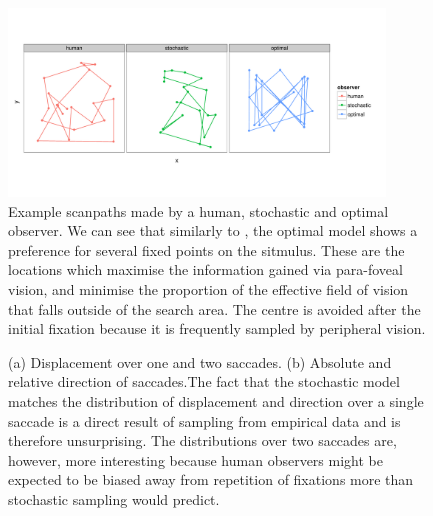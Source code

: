 \documentclass[preprint, authoryear]{elsarticle} %
\begin{document}
\begin{figure}
	\centering
	\includegraphics[width=10cm]{fig/exScanpaths.pdf}
	\caption{Example scanpaths made by a human, stochastic and optimal observer. We can see that similarly to \citet{najemnik-geisler2008}, the optimal model shows a preference for several fixed points on the sitmulus. These are the locations which maximise the information gained via para-foveal vision, and minimise the proportion of the effective field of vision that falls outside of the search area. The centre is avoided after the initial fixation because it is frequently sampled by peripheral vision.} 
	\label{fig:exScanpaths}
\end{figure}


\begin{figure}
	\centering
	\caption{(a) Displacement over one and two saccades. (b) Absolute and relative direction of saccades.The fact that the stochastic model matches the distribution of displacement and direction over a single saccade is a direct result of sampling from empirical data and is therefore unsurprising. The distributions over two saccades are, however, more interesting because human observers might be expected to be biased away from repetition of fixations more than stochastic sampling would predict.}
	\label{fig:onetwostats}
\end{figure}
\end{document}
